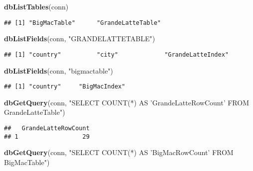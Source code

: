 \documentclass[]{article}
\newenvironment{Shaded}{\begin{snugshade}}{\end{snugshade}}
\newcommand{\KeywordTok}[1]{\textcolor[rgb]{0.13,0.29,0.53}{\textbf{#1}}}
\newcommand{\NormalTok}[1]{#1}
\newcommand{\StringTok}[1]{\textcolor[rgb]{0.31,0.60,0.02}{#1}}
\begin{document}
\begin{Shaded}
\begin{Highlighting}[]
\KeywordTok{dbListTables}\NormalTok{(conn)}
\end{Highlighting}
\end{Shaded}

\begin{verbatim}
## [1] "BigMacTable"      "GrandeLatteTable"
\end{verbatim}

\begin{Shaded}
\begin{Highlighting}[]
\KeywordTok{dbListFields}\NormalTok{(conn, }\StringTok{"GRANDELATTETABLE"}\NormalTok{)}
\end{Highlighting}
\end{Shaded}

\begin{verbatim}
## [1] "country"          "city"             "GrandeLatteIndex"
\end{verbatim}

\begin{Shaded}
\begin{Highlighting}[]
\KeywordTok{dbListFields}\NormalTok{(conn, }\StringTok{"bigmactable"}\NormalTok{)}
\end{Highlighting}
\end{Shaded}

\begin{verbatim}
## [1] "country"     "BigMacIndex"
\end{verbatim}

\begin{Shaded}
\begin{Highlighting}[]
\KeywordTok{dbGetQuery}\NormalTok{(conn, }\StringTok{"SELECT COUNT(*) AS 'GrandeLatteRowCount' FROM GrandeLatteTable"}\NormalTok{)}
\end{Highlighting}
\end{Shaded}

\begin{verbatim}
##   GrandeLatteRowCount
## 1                  29
\end{verbatim}

\begin{Shaded}
\begin{Highlighting}[]
\KeywordTok{dbGetQuery}\NormalTok{(conn, }\StringTok{"SELECT COUNT(*) AS 'BigMacRowCount' FROM BigMacTable"}\NormalTok{)}
\end{Highlighting}
\end{Shaded}
\end{document}
